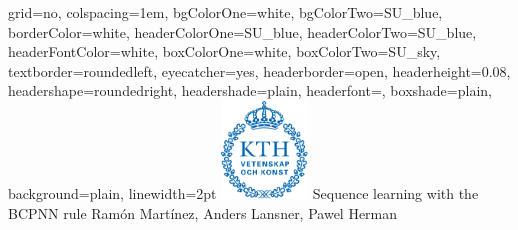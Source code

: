 \documentclass[portrait,final]{baposter}
\begin{document}

\newlength{\leftimgwidth}
\begin{poster}%
  {
  grid=no,
  colspacing=1em,
  bgColorOne=white,
  bgColorTwo=SU_blue,
  borderColor=white,
  headerColorOne=SU_blue,
  headerColorTwo=SU_blue,
  headerFontColor=white,
  boxColorOne=white, %
  boxColorTwo=SU_sky,
  textborder=roundedleft,
  eyecatcher=yes,
  headerborder=open,
  headerheight=0.08\textheight,
  headershape=roundedright,
  headershade=plain,
  headerfont=\Large\textsf, %
  boxshade=plain,
  background=plain,
  linewidth=2pt
  }
  {\includegraphics[height=7em]{Kth_logo.png}} %
  {\sf %
  \color{black} Sequence learning with the BCPNN rule}
  {\sf %
  \vspace{0.5em}
  \color{SU_fire} Ram\'on Mart\'inez,  Anders Lansner, Pawel Herman
  }
  {%
  }


\end{poster}
\end{document}
